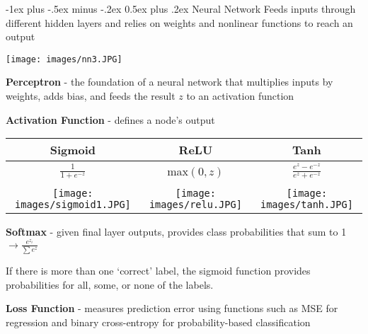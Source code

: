 \documentclass[10pt,landscape]{article}
\makeatletter
\renewcommand{\section}{\@startsection{section}{1}{0mm}%
                                {-1ex plus -.5ex minus -.2ex}%
                                {0.5ex plus .2ex}%
                                {\normalfont\large\bfseries}}
\makeatother
\begin{document}
\begin{multicols}{3}
\section{Neural Network}
Feeds inputs through different hidden layers and relies on weights and nonlinear functions to reach an output
\vspace{-1mm}
\begin{center}
    \texttt{[image: images/nn3.JPG]}
\end{center}
\vspace{-1mm}
\textbf{Perceptron} - the foundation of a neural network that multiplies inputs by weights, adds bias, and feeds the result $z$ to an activation function

\textbf{Activation Function} - defines a node's output

\vspace{-1mm}
\begin{center}
\begin{tabular}{c|c|c}
          Sigmoid & ReLU & Tanh\\
         \hline
         \rule{0pt}{3ex}
         $\frac{1}{1+e^{-z}} $  & max$(0,z)$ & $\frac{e^z - e^{-z}}{e^z + e^{-z}}$\\
           &   &  \vspace{-2mm}\\

         \hline
         \texttt{[image: images/sigmoid1.JPG]} &
         \texttt{[image: images/relu.JPG]} &
         \texttt{[image: images/tanh.JPG]}

\end{tabular}
\end{center}
\textbf{Softmax} - given final layer outputs, provides class probabilities that sum to 1 $\to \frac{e^{z_i}}{\sum e^{z}}$

If there is more than one `correct' label, the sigmoid function provides probabilities for all, some, or none of the labels.


\smallskip
\textbf{Loss Function} - measures prediction error using functions such as MSE for regression and binary cross-entropy for probability-based classification


\end{multicols}
\end{document}
